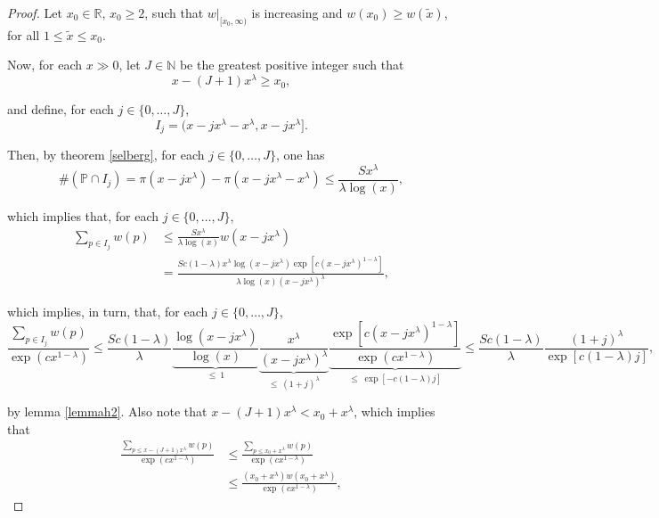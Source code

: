 \documentclass[11pt]{amsart}
\numberwithin{equation}{section}
\newcommand{\N}{\mathbb{N}}
\newcommand{\R}{\mathbb{R}}
\newcommand{\disum}{\displaystyle \sum}
\newcommand{\difrac}{\displaystyle \frac}
\begin{document}
\begin{proof} Let $x_0 \in \R$, $x_0 \geq 2$, such that $w|_{[x_0, \infty)}$ is increasing and $w(x_0) \geq w(\tilde x)$, for all $1 \leq \tilde x \leq x_0$.

Now, for each $x \gg 0$, let $J \in \N$ be the greatest positive integer such that $$x - (J + 1)x^{\lambda} \geq x_0,$$

\noindent and define, for each $j \in \{0, \ldots, J\}$, $$I_j = (x - jx^{\lambda} - x^{\lambda}, x - jx^{\lambda}].$$

Then, by theorem \ref{selberg}, for each $j \in \{0, \ldots, J\}$, one has $$\#(\mathbb{P} \cap I_j) = \pi(x - jx^{\lambda}) - \pi(x - jx^{\lambda} - x^{\lambda}) \leq \difrac{Sx^{\lambda}}{\lambda \log(x)},$$

\noindent which implies that, for each $j \in \{0, \ldots, J\}$, \begin{equation*} \begin{split} \disum_{p \in I_j} w(p) & \leq \difrac{Sx^{\lambda}}{\lambda \log(x)} w(x - jx^{\lambda}) \\ & = \difrac{Sc(1 - \lambda) x^{\lambda} \log(x - jx^{\lambda}) \exp[c(x - jx^{\lambda})^{1 - \lambda}]}{\lambda \log(x) (x - jx^{\lambda})^{\lambda}},\end{split} \end{equation*}

\noindent which implies, in turn, that, for each $j \in \{0, \ldots, J\}$, $$\difrac{\disum_{p \in I_j} w(p)}{\exp(cx^{1 - \lambda})} \leq \difrac{Sc(1 - \lambda)}{\lambda} \underbrace{\difrac{\log(x - jx^{\lambda})}{\log(x)}}_{\leq \ 1} \underbrace{\difrac{x^{\lambda}}{(x - jx^{\lambda})^{\lambda}}}_{\leq \ (1 + j)^{\lambda}} \underbrace{\difrac{\exp[c(x - jx^{\lambda})^{1 - \lambda}]}{\exp(cx^{1 - \lambda})}}_{\leq \ \exp[-c(1 - \lambda)j]} \leq \difrac{Sc(1 - \lambda)}{\lambda} \difrac{(1 + j)^{\lambda}}{\exp[c(1 - \lambda)j]},$$

\noindent by lemma \ref{lemmah2}. Also note that $x - (J + 1)x^{\lambda} < x_0 + x^{\lambda}$, which implies that \begin{equation*} \begin{split} \difrac{\disum_{p \leq x - (J + 1)x^{\lambda}} w(p)}{\exp(cx^{1 - \lambda})} & \leq \difrac{\disum_{p \leq x_0 +x^{\lambda}} w(p)}{\exp(cx^{1 - \lambda})} \\ & \leq \difrac{(x_0 + x^{\lambda})w(x_0 + x^{\lambda})}{\exp(cx^{1 - \lambda})}, \end{split} \end{equation*}


\end{proof}
\end{document}
